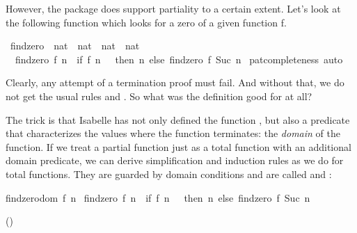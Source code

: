 \begin{isabellebody}
\begin{isamarkuptext}
  However, the  package does support partiality to a
  certain extent. Let's look at the following function which looks
  for a zero of a given function f.%
\end{isamarkuptext}%
\isamarkuptrue%
\isamarkupfalse%
\ findzero\ {\isacharcolon}{\isacharcolon}\ {\isachardoublequoteopen}{\isacharparenleft}nat\ {\isasymRightarrow}\ nat{\isacharparenright}\ {\isasymRightarrow}\ nat\ {\isasymRightarrow}\ nat{\isachardoublequoteclose}\isanewline
{}\isanewline
\ \ {\isachardoublequoteopen}findzero\ f\ n\ {\isacharequal}\ {\isacharparenleft}if\ f\ n\ {\isacharequal}\ {}\ then\ n\ else\ findzero\ f\ {\isacharparenleft}Suc\ n{\isacharparenright}{\isacharparenright}{\isachardoublequoteclose}\isanewline
%
\isadelimproof
%
\endisadelimproof
%
\isatagproof
{}\isamarkupfalse%
\ pat{\isacharunderscore}completeness\ auto%
\endisatagproof
{\isafoldproof}%
%
\isadelimproof
%
\endisadelimproof
%
\begin{isamarkuptext}%
\noindent Clearly, any attempt of a termination proof must fail. And without
  that, we do not get the usual rules  and 
  . So what was the definition good for at all?%
\end{isamarkuptext}%
\isamarkuptrue%
%
\isamarkuptrue%
%
\begin{isamarkuptext}%
The trick is that Isabelle has not only defined the function , but also
  a predicate  that characterizes the values where the function
  terminates: the \emph{domain} of the function. If we treat a
  partial function just as a total function with an additional domain
  predicate, we can derive simplification and
  induction rules as we do for total functions. They are guarded
  by domain conditions and are called  and :%
\end{isamarkuptext}%
\isamarkuptrue%
%
\begin{isamarkuptext}%
\noindent\begin{minipage}{0.79\textwidth}\begin{isabelle}%
findzero{\isacharunderscore}dom\ {\isacharparenleft}{\isacharquery}f{\isacharcomma}\ {\isacharquery}n{\isacharparenright}\ {\isasymLongrightarrow}\isanewline
findzero\ {\isacharquery}f\ {\isacharquery}n\ {\isacharequal}\ {\isacharparenleft}if\ {\isacharquery}f\ {\isacharquery}n\ {\isacharequal}\ {}\ then\ {\isacharquery}n\ else\ findzero\ {\isacharquery}f\ {\isacharparenleft}Suc\ {\isacharquery}n{\isacharparenright}{\isacharparenright}%
\end{isabelle}\end{minipage}
  \hfill()
  \vspace{1em}


\end{isamarkuptext}
\end{isabellebody}

